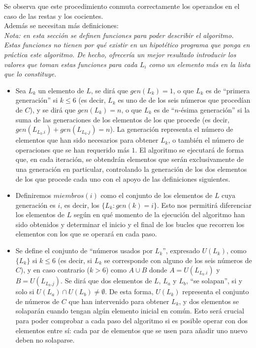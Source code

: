 Se observa que este procedimiento conmuta correctamente los operandos en el caso
de las restas y los cocientes. \\

Además se necesitan más definiciones:\\
\emph{Nota: en esta sección se definen funciones para poder describir el algoritmo.
Estas funciones no tienen por qué existir en un hipotético programa que ponga en
práctica este algoritmo. De hecho, ofrecería un mejor resultado introducir los
valores que toman estas funciones para cada $L_i$ como un elemento más en la
lista que lo constituye.}
\begin{itemize}
	\item Sea $L_k$ un elemento de $L$, se dirá que $gen(L_k) = 1$, o que $L_k$ es
	de ``primera generación'' si $k \le 6$ (es decir, $L_k$ es uno de de los seis
	números que procedían de $C$), y se dirá que $gen(L_k) = n$, o que $L_k$ es
	de ``$n$-ésima generación'' si la suma de las generaciones de los elementos
	de los que procede (es decir, $gen(L_{L_k.i}) + gen(L_{L_k.j}) = n$).
	La generación representa el número de elementos que han sido necesarios
	para obtener $L_k$, o también el número de operaciones que se han
	requerido más $1$.
	El algoritmo se ejecutará de forma que, en cada iteración, se obtendrán
	elementos que serán exclusivamente de una generación en particular,
	controlando la generación de los dos elementos de los que procede cada uno con
	el apoyo de las definiciones siguientes.

	\item Definiremos $miembros(i)$ como el conjunto de los elementos de $L$ cuya
	generación es $i$, es decir, los $\{L_k : gen(k) = i\}$. Esto nos permitirá
	diferenciar los elementos de $L$ según en qué momento de la ejecución del
	algoritmo han sido obtenidos y determinar el inicio y el final de los bucles
	que recorren los elementos con los que se operará en cada paso.

	\item Se define el conjunto de ``números usados por $L_k$'', expresado
	$U(L_k)$, como $\{L_k\}$ si $k \le 6$ (es decir, si $L_k$ se corresponde con
	alguno de los seis números de $C$), y en caso contrario ($k > 6$) como
	$A \cup B$ donde $A =U(L_{L_k.i})$ y $B = U(L_{L_k.j})$. Se dirá que dos
	elementos de $L$, $L_a$ y $L_b$, ``se solapan'', si y solo si
	$U(L_a) \cap  U(L_b) \ne \emptyset$.
	De esta forma, $U(L_k)$ representa el conjunto de números de $C$ que han
	intervenido para obtener $L_k$, y dos elementos se solaparán cuando tengan
	algún elemento inicial en común. Esto será crucial para poder comprobar a cada
	paso del algoritmo si es posible operar con dos elementos entre sí: cada par
	de elementos que se usen para añadir uno nuevo deben no solaparse.

\end{itemize}

